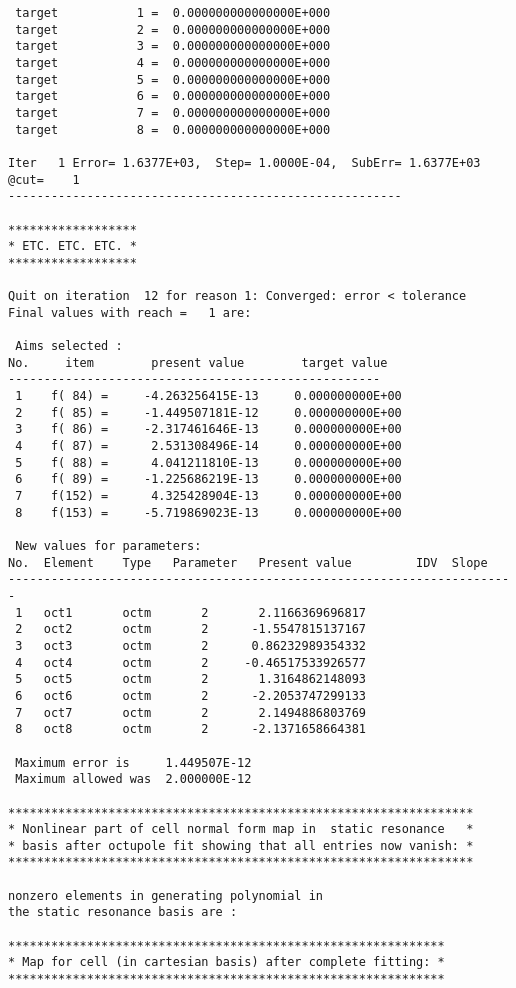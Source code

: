 \begin{footnotesize}
\begin{verbatim}
 target           1 =  0.000000000000000E+000
 target           2 =  0.000000000000000E+000
 target           3 =  0.000000000000000E+000
 target           4 =  0.000000000000000E+000
 target           5 =  0.000000000000000E+000
 target           6 =  0.000000000000000E+000
 target           7 =  0.000000000000000E+000
 target           8 =  0.000000000000000E+000

Iter   1 Error= 1.6377E+03,  Step= 1.0000E-04,  SubErr= 1.6377E+03 @cut=    1
-------------------------------------------------------

******************
* ETC. ETC. ETC. *
******************

Quit on iteration  12 for reason 1: Converged: error < tolerance
Final values with reach =   1 are:

 Aims selected :
No.     item        present value        target value
----------------------------------------------------
 1    f( 84) =     -4.263256415E-13     0.000000000E+00
 2    f( 85) =     -1.449507181E-12     0.000000000E+00
 3    f( 86) =     -2.317461646E-13     0.000000000E+00
 4    f( 87) =      2.531308496E-14     0.000000000E+00
 5    f( 88) =      4.041211810E-13     0.000000000E+00
 6    f( 89) =     -1.225686219E-13     0.000000000E+00
 7    f(152) =      4.325428904E-13     0.000000000E+00
 8    f(153) =     -5.719869023E-13     0.000000000E+00

 New values for parameters:
No.  Element    Type   Parameter   Present value         IDV  Slope
-----------------------------------------------------------------------
 1   oct1       octm       2       2.1166369696817
 2   oct2       octm       2      -1.5547815137167
 3   oct3       octm       2      0.86232989354332
 4   oct4       octm       2     -0.46517533926577
 5   oct5       octm       2       1.3164862148093
 6   oct6       octm       2      -2.2053747299133
 7   oct7       octm       2       2.1494886803769
 8   oct8       octm       2      -2.1371658664381

 Maximum error is     1.449507E-12
 Maximum allowed was  2.000000E-12

*****************************************************************
* Nonlinear part of cell normal form map in  static resonance   *
* basis after octupole fit showing that all entries now vanish: *
*****************************************************************

nonzero elements in generating polynomial in
the static resonance basis are :

*************************************************************
* Map for cell (in cartesian basis) after complete fitting: *
*************************************************************


\end{verbatim}
\end{footnotesize}
